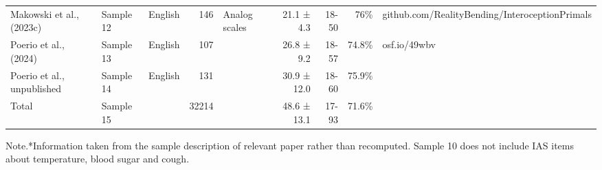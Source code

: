 \begin{table}[!t]
\begin{tabular*}{\linewidth}{@{\extracolsep{\fill}}lllrlrrrl}
Makowski et al., (2023c) & Sample 12 & English & 146 & Analog scales & 21.1 ± 4.3 & 18-50 & 76\% & github.com/RealityBending/InteroceptionPrimals \\ 
Poerio et al., (2024) & Sample 13 & English & 107 &  & 26.8 ± 9.2 & 18-57 & 74.8\% & osf.io/49wbv \\ 
Poerio et al., unpublished & Sample 14 & English & 131 &  & 30.9 ± 12.0 & 18-60 & 75.9\% &  \\ 
Total & Sample 15 &  & 32214 &  & 48.6 ± 13.1 & 17-93 & 71.6\% &  \\ 
\bottomrule
\end{tabular*}
\begin{minipage}{\linewidth}
Note.*Information taken from the sample description of relevant paper rather than recomputed. Sample 10 does not include IAS items about temperature, blood sugar and cough.\\
\end{minipage}
\end{table}

